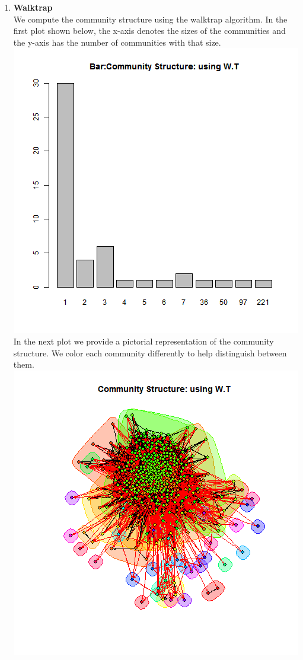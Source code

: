 \documentclass{article}
\begin{document}
\begin{enumerate}
\item \textbf{Walktrap}\\
 We compute the community structure using the walktrap algorithm.
 In the first plot shown below, the x-axis denotes the sizes of the communities and the y-axis has the number of communities with that size.\\
	\includegraphics[scale=0.4]{7_1f} \\
	In the next plot we provide a pictorial representation of the community structure.
	We color each community differently to help distinguish between them.\\
	\includegraphics[scale=0.7]{7_1g} \\ 


\end{enumerate}
\end{document}
